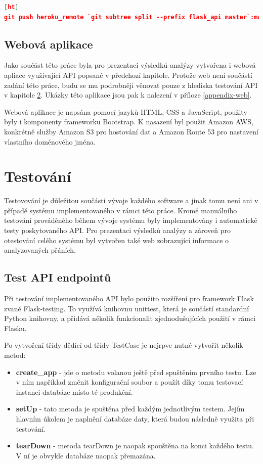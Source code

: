 \documentclass[thesis=B,czech]{FITthesis}[2012/06/26]
\begin{document}
\begin{lstlisting}[language=json,firstnumber=1][ht]
git push heroku_remote `git subtree split --prefix flask_api master`:master --force
\end{lstlisting}



\section{Webová aplikace}
	Jako součást této práce byla pro prezentaci výsledků analýzy vytvořena i webová apliace využívající API popsané v předchozí kapitole. Protože web není součástí zadání této práce, budu se mu podrobněji věnovat pouze z hlediska testování API v kapitole \ref{testovani}. Ukázky této aplikace jsou pak k nalezení v příloze \ref{appendix-web}.  
	
	Webová aplikace je napsána pomocí jazyků HTML, CSS a JavaScript, použity byly i komponenty frameworku Bootstrap. K nasazení byl použit Amazon AWS, konkrétně služby Amazon S3 pro hostování dat a Amazon Route 53 pro nastavení vlastního doménového jména. 


\chapter{Testování}
\label{testovani}
Testovování je důležitou součástí vývoje každého software a jinak tomu není ani v případě systému implementovaného v rámci této práce. Kromě manuálního testování prováděného během vývoje systému byly implementovány i automatické testy poskytovaného API. Pro prezentaci výsledků analýzy a zároveň pro otestování celého systému byl vytvořen také web zobrazující informace o analyzovaných přáních. 


\section{Test API endpointů}
\label{api-testing}
Při testování implementovaného API bylo použito rozšíření pro framework Flask zvané Flask-testing. To využívá knihovnu unittest, která je součástí standardní Python knihovny, a přidává několik funkcionalit zjednodušujících použití v rámci Flasku. 

Po vytvoření třídy dědící od třídy TestCase je nejrpve nutné vytvořit několik metod:

\begin{itemize}
\item \textbf{create\_app} - jde o metodu volanou ještě před spuštěním prvního testu. Lze v ním například změnit konfigurační soubor a použít díky tomu testovací instanci databáze místo té produkční. 
\item \textbf{setUp} - tato metoda je spuštěna před každým jednotlivým testem. Jejím hlavním úkolem je naplnění databáze daty, která budou následně využita při testování. 
\item \textbf{tearDown} - metoda tearDown je naopak spouštěna na konci každého testu. V ní je obvykle databáze naopak přemazána. 
\end{itemize}
\end{document}
